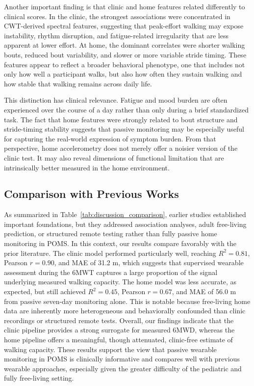 \documentclass{article}
\begin{document}
Another important finding is that clinic and home features related differently to clinical scores. In the clinic, the strongest associations were concentrated in CWT-derived spectral features, suggesting that peak-effort walking may expose instability, rhythm disruption, and fatigue-related irregularity that are less apparent at lower effort. At home, the dominant correlates were shorter walking bouts, reduced bout variability, and slower or more variable stride timing. These features appear to reflect a broader behavioral phenotype, one that includes not only how well a participant walks, but also how often they sustain walking and how stable that walking remains across daily life.

This distinction has clinical relevance. Fatigue and mood burden are often experienced over the course of a day rather than only during a brief standardized task. The fact that home features were strongly related to bout structure and stride-timing stability suggests that passive monitoring may be especially useful for capturing the real-world expression of symptom burden. From that perspective, home accelerometry does not merely offer a noisier version of the clinic test. It may also reveal dimensions of functional limitation that are intrinsically better measured in the home environment.

\subsection{Comparison with Previous Works}

As summarized in Table~\ref{tab:discussion_comparison}, earlier studies established important foundations, but they addressed association analyses, adult free-living prediction, or structured remote testing rather than fully passive home monitoring in POMS. In this context, our results compare favorably with the prior literature. The clinic model performed particularly well, reaching $R^2 = 0.81$, Pearson $r = 0.90$, and MAE of 31.2 m, which suggests that supervised wearable assessment during the 6MWT captures a large proportion of the signal underlying measured walking capacity. The home model was less accurate, as expected, but still achieved $R^2 = 0.45$, Pearson $r = 0.67$, and MAE of 56.0 m from passive seven-day monitoring alone. This is notable because free-living home data are inherently more heterogeneous and behaviorally confounded than clinic recordings or structured remote tests. Overall, our findings indicate that the clinic pipeline provides a strong surrogate for measured 6MWD, whereas the home pipeline offers a meaningful, though attenuated, clinic-free estimate of walking capacity. These results support the view that passive wearable monitoring in POMS is clinically informative and compares well with previous wearable approaches, especially given the greater difficulty of the pediatric and fully free-living setting.
\end{document}
